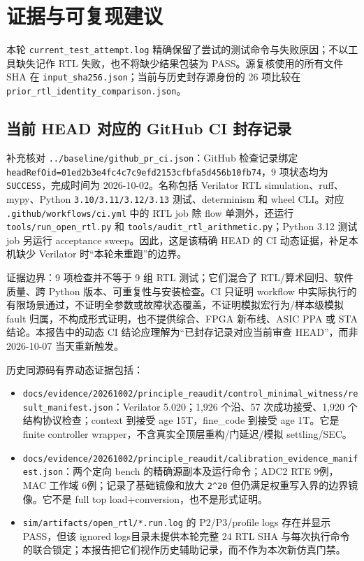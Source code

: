 \documentclass[UTF8,fontset=fandol,10pt,a4paper,openany]{ctexrep}
\newcommand{\code}[1]{\nolinkurl{#1}}
\begin{document}
\section{证据与可复现建议}


本轮 \code{current_test_attempt.log} 精确保留了尝试的测试命令与失败原因；不以工具缺失记作 RTL 失败，也不将缺少结果包装为 PASS。源复核使用的所有文件 SHA 在 \code{input_sha256.json}；当前与历史封存源身份的 26 项比较在 \code{prior_rtl_identity_comparison.json}。


\subsection{当前 HEAD 对应的 GitHub CI 封存记录}


补充核对 \code{../baseline/github_pr_ci.json}：GitHub 检查记录绑定 \code{headRefOid=01ed2b3e4fc4c7c9efd2153cfbfa5d456b10fb74}，9 项状态均为 \code{SUCCESS}，完成时间为 2026-10-02。名称包括 Verilator RTL simulation、ruff、mypy、Python \code{3.10/3.11/3.12/3.13} 测试、determinism 和 wheel CLI。对应 \code{.github/workflows/ci.yml} 中的 RTL job 除 flow 单测外，还运行 \code{tools/run_open_rtl.py} 和 \code{tools/audit_rtl_arithmetic.py}；Python 3.12 测试 job 另运行 acceptance sweep。因此，这是该精确 HEAD 的 CI 动态证据，补足本机缺少 Verilator 时“本轮未重跑”的边界。


证据边界：9 项检查并不等于 9 组 RTL 测试；它们混合了 RTL/算术回归、软件质量、跨 Python 版本、可重复性与安装检查。CI 只证明 workflow 中实际执行的有限场景通过，不证明全参数或故障状态覆盖，不证明模拟宏行为/样本级模拟 fault 归属，不构成形式证明，也不提供综合、FPGA 新布线、ASIC PPA 或 STA 结论。本报告中的动态 CI 结论应理解为“已封存记录对应当前审查 HEAD”，而非 2026-10-07 当天重新触发。


历史同源码有界动态证据包括：


\begin{itemize}
\item \code{docs/evidence/20261002/principle_reaudit/control_minimal_witness/result_manifest.json}：Verilator 5.020；1,926 个沿、57 次成功接受、1,920 个结构协议检查；context 到接受 age 15T，fine\_code 到接受 age 1T。它是 finite controller wrapper，不含真实全顶层重构/门延迟/模拟 settling/SEC。
\item \code{docs/evidence/20261002/principle_reaudit/calibration_evidence_manifest.json}：两个定向 bench 的精确源副本及运行命令；ADC2 RTE 9例，MAC 工作域 6例；记录了基础镜像和放大 \code{2^20} 但仍满足权重写入界的边界镜像。它不是 full top load+conversion，也不是形式证明。
\item \code{sim/artifacts/open_rtl/*.run.log} 的 P2/P3/profile logs 存在并显示 PASS，但该 ignored logs目录未提供本轮完整 24 RTL SHA 与每次执行命令的联合锁定；本报告把它们视作历史辅助记录，而不作为本次新仿真门禁。
\end{itemize}
\end{document}
